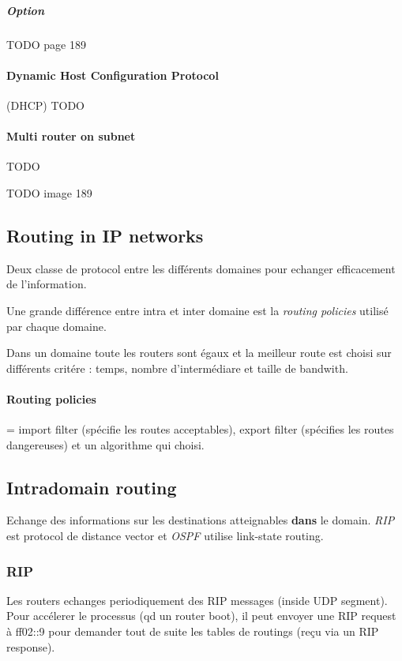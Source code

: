 \subparagraph{Option}
TODO page 189

\paragraph{Dynamic Host Configuration Protocol} (DHCP)
TODO

\paragraph{Multi router on subnet}
TODO



TODO image 189

\subsection{Routing in IP networks}
Deux classe de protocol entre les différents domaines pour echanger
efficacement de l'information.

Une grande différence entre intra et inter domaine est la \textit{routing policies}
utilisé par chaque domaine.

Dans un domaine toute les routers sont égaux et la meilleur route est choisi sur
différents critére : temps, nombre d'intermédiare et taille de bandwith.

\paragraph{Routing  policies}  =  import filter  (spécifie  les  routes
acceptables), export  filter (spécifies  les routes dangereuses)  et un
algorithme qui choisi.


\subsection{Intradomain routing}
Echange des informations sur les destinations atteignables \textbf{dans} le domain.
\textit{RIP} est protocol de distance vector et \textit{OSPF} utilise link-state routing.

\subsubsection{RIP}
Les routers echanges periodiquement des RIP messages (inside UDP segment).
Pour accélerer le processus (qd un router boot), il peut envoyer une RIP request à ff02::9
pour demander tout de suite les tables de routings (reçu via un RIP response).

